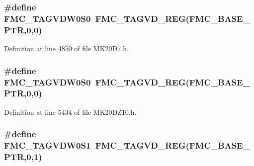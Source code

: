 \subsubsection[{\texorpdfstring{F\+M\+C\+\_\+\+T\+A\+G\+V\+D\+W0\+S0}{FMC_TAGVDW0S0}}]{\setlength{\rightskip}{0pt plus 5cm}\#define F\+M\+C\+\_\+\+T\+A\+G\+V\+D\+W0\+S0~{\bf F\+M\+C\+\_\+\+T\+A\+G\+V\+D\+\_\+\+R\+EG}({\bf F\+M\+C\+\_\+\+B\+A\+S\+E\+\_\+\+P\+TR},0,0)}\hypertarget{group___f_m_c___register___accessor___macros_ga08d4b90c8e72268ad41591521e7df7d7}{}\label{group___f_m_c___register___accessor___macros_ga08d4b90c8e72268ad41591521e7df7d7}


Definition at line 4850 of file M\+K20\+D7.\+h.

\subsubsection[{\texorpdfstring{F\+M\+C\+\_\+\+T\+A\+G\+V\+D\+W0\+S0}{FMC_TAGVDW0S0}}]{\setlength{\rightskip}{0pt plus 5cm}\#define F\+M\+C\+\_\+\+T\+A\+G\+V\+D\+W0\+S0~{\bf F\+M\+C\+\_\+\+T\+A\+G\+V\+D\+\_\+\+R\+EG}({\bf F\+M\+C\+\_\+\+B\+A\+S\+E\+\_\+\+P\+TR},0,0)}\hypertarget{group___f_m_c___register___accessor___macros_ga08d4b90c8e72268ad41591521e7df7d7}{}\label{group___f_m_c___register___accessor___macros_ga08d4b90c8e72268ad41591521e7df7d7}


Definition at line 5434 of file M\+K20\+D\+Z10.\+h.

\subsubsection[{\texorpdfstring{F\+M\+C\+\_\+\+T\+A\+G\+V\+D\+W0\+S1}{FMC_TAGVDW0S1}}]{\setlength{\rightskip}{0pt plus 5cm}\#define F\+M\+C\+\_\+\+T\+A\+G\+V\+D\+W0\+S1~{\bf F\+M\+C\+\_\+\+T\+A\+G\+V\+D\+\_\+\+R\+EG}({\bf F\+M\+C\+\_\+\+B\+A\+S\+E\+\_\+\+P\+TR},0,1)}\hypertarget{group___f_m_c___register___accessor___macros_gab0cb5db7eacdaa6c0f4317a6af85ee1e}{}\label{group___f_m_c___register___accessor___macros_gab0cb5db7eacdaa6c0f4317a6af85ee1e}


